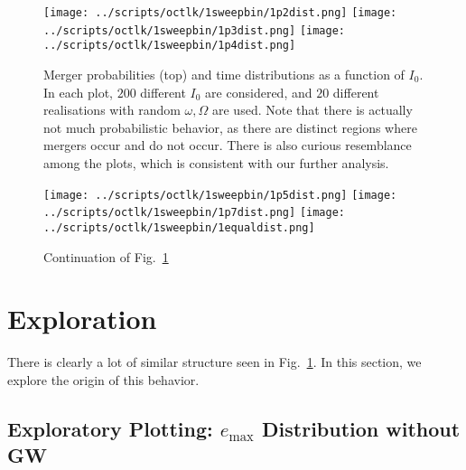 \documentclass[11pt,
        usenames, %
        dvipsnames %
    ]{article}
\begin{document}
\begin{figure}
    \centering
    \texttt{[image: ../scripts/octlk/1sweepbin/1p2dist.png]}
    \texttt{[image: ../scripts/octlk/1sweepbin/1p3dist.png]}
    \texttt{[image: ../scripts/octlk/1sweepbin/1p4dist.png]}
    \caption{Merger probabilities (top) and time distributions as a function of
    $I_0$. In each plot, $200$ different $I_0$ are considered, and $20$
    different realisations with random $\omega, \Omega$ are used. Note that
    there is actually not much probabilistic behavior, as there are distinct
    regions where mergers occur and do not occur. There is also curious
    resemblance among the plots, which is consistent with our further
    analysis.}\label{fig:mergers}
\end{figure}
\begin{figure}
    \centering
    \texttt{[image: ../scripts/octlk/1sweepbin/1p5dist.png]}
    \texttt{[image: ../scripts/octlk/1sweepbin/1p7dist.png]}
    \texttt{[image: ../scripts/octlk/1sweepbin/1equaldist.png]}
    \caption{Continuation of Fig.~\ref{fig:mergers}}\label{fig:mergers2}
\end{figure}

\section{Exploration}

There is clearly a lot of similar structure seen in Fig.~\ref{fig:mergers}. In
this section, we explore the origin of this behavior.

\subsection{Exploratory Plotting: $e_{\max}$ Distribution without GW}
\end{document}
